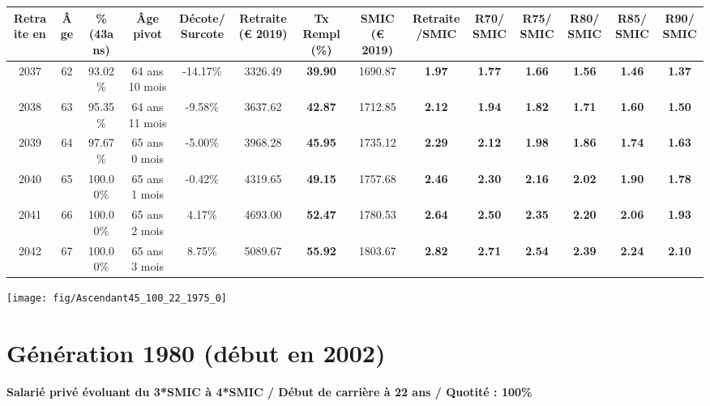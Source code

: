 \begin{adjustbox}{max width=\textwidth} 
\begin{tabular}[htb]{|c|c||c|c|c||c|c||c|c||c|c|c|c|c|} 
\hline 
 Retraite en &  Âge &  \%(43ans) &  Âge pivot &  Décote/Surcote &  Retraite (\euro{} 2019) &  Tx Rempl(\%) &  SMIC (\euro{} 2019) &  Retraite/SMIC &  R70/SMIC &  R75/SMIC &  R80/SMIC &  R85/SMIC &  R90/SMIC \\ 
\hline \hline 
 2037 &  62 &  93.02\% &  64 ans 10 mois &  -14.17\% &  3326.49 &  {\bf 39.90} &  1690.87 &  {\bf 1.97} &  {\bf 1.77} &  {\bf 1.66} &  {\bf 1.56} &  {\bf 1.46} &  {\bf 1.37} \\ 
\hline 
 2038 &  63 &  95.35\% &  64 ans 11 mois &  -9.58\% &  3637.62 &  {\bf 42.87} &  1712.85 &  {\bf 2.12} &  {\bf 1.94} &  {\bf 1.82} &  {\bf 1.71} &  {\bf 1.60} &  {\bf 1.50} \\ 
\hline 
 2039 &  64 &  97.67\% &  65 ans 0 mois &  -5.00\% &  3968.28 &  {\bf 45.95} &  1735.12 &  {\bf 2.29} &  {\bf 2.12} &  {\bf 1.98} &  {\bf 1.86} &  {\bf 1.74} &  {\bf 1.63} \\ 
\hline 
 2040 &  65 &  100.00\% &  65 ans 1 mois &  -0.42\% &  4319.65 &  {\bf 49.15} &  1757.68 &  {\bf 2.46} &  {\bf 2.30} &  {\bf 2.16} &  {\bf 2.02} &  {\bf 1.90} &  {\bf 1.78} \\ 
\hline 
 2041 &  66 &  100.00\% &  65 ans 2 mois &  4.17\% &  4693.00 &  {\bf 52.47} &  1780.53 &  {\bf 2.64} &  {\bf 2.50} &  {\bf 2.35} &  {\bf 2.20} &  {\bf 2.06} &  {\bf 1.93} \\ 
\hline 
 2042 &  67 &  100.00\% &  65 ans 3 mois &  8.75\% &  5089.67 &  {\bf 55.92} &  1803.67 &  {\bf 2.82} &  {\bf 2.71} &  {\bf 2.54} &  {\bf 2.39} &  {\bf 2.24} &  {\bf 2.10} \\ 
\hline 
\hline 
\end{tabular} 
\end{adjustbox} 
 
 \vspace{0.1cm} 

 {\hspace{-2.2cm}\texttt{[image: fig/Ascendant45\_100\_22\_1975\_0]}} 

\newpage 
 
\section{Génération 1980 (début en 2002)\label{Ascendant45_100_22_1980_0}} 
 
{\bf \noindent Salarié privé évoluant du 3*SMIC à 4*SMIC / Début de carrière à 22 ans / Quotité : 100\%}  ~ 

